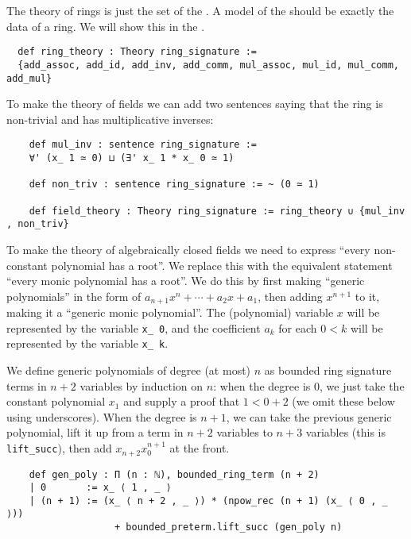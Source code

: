 \begin{dfn}

  The theory of rings is just the set of the
  .
  A model of the  should be exactly the data of a ring.
  We will show this in the .

\begin{lstlisting}
  def ring_theory : Theory ring_signature :=
  {add_assoc, add_id, add_inv, add_comm, mul_assoc, mul_id, mul_comm, add_mul}\end{lstlisting}

  To make the theory of fields we can add two sentences saying that
  the ring is non-trivial and has multiplicative inverses:
  \begin{lstlisting}
    def mul_inv : sentence ring_signature :=
    ∀' (x_ 1 ≃ 0) ⊔ (∃' x_ 1 * x_ 0 ≃ 1)

    def non_triv : sentence ring_signature := ~ (0 ≃ 1)

    def field_theory : Theory ring_signature := ring_theory ∪ {mul_inv , non_triv} \end{lstlisting}

  To make the theory of algebraically closed fields we need to express
  ``every non-constant polynomial has a root''.
  We replace this with the equivalent statement ``every monic polynomial has a root''.
  We do this by first making ``generic polynomials''
  in the form of $a_{n+1}x^{n} + \cdots + a_{2}x + a_{1}$,
  then adding $x^{n+1}$ to it, making it a ``generic monic polynomial''.
  The (polynomial) variable $x$ will be represented by the variable \texttt{x\_ 0},
  and the coefficient $a_{k}$ for each $0 < k$ will be represented by the variable
  \texttt{x\_ k}.

  We define generic polynomials of degree (at most) $n$ as bounded ring signature terms
  in $n + 2$ variables by induction on $n$:
  when the degree is $0$, we just take the constant polynomial $x_{1}$
  and supply a proof that $1 < 0 + 2$ (we omit these below using underscores).
  When the degree is $n + 1$, we can take the previous generic polynomial,
  lift it up from a term in $n + 2$ variables to $n + 3$ variables
  (this is \texttt{lift\_succ}),
  then add $x_{n + 2} x_{0}^{n+1}$ at the front.

  \begin{lstlisting}
    def gen_poly : Π (n : ℕ), bounded_ring_term (n + 2)
    | 0       := x_ ⟨ 1 , _ ⟩
    | (n + 1) := (x_ ⟨ n + 2 , _ ⟩) * (npow_rec (n + 1) (x_ ⟨ 0 , _ ⟩))
                   + bounded_preterm.lift_succ (gen_poly n)\end{lstlisting}


\end{dfn}
